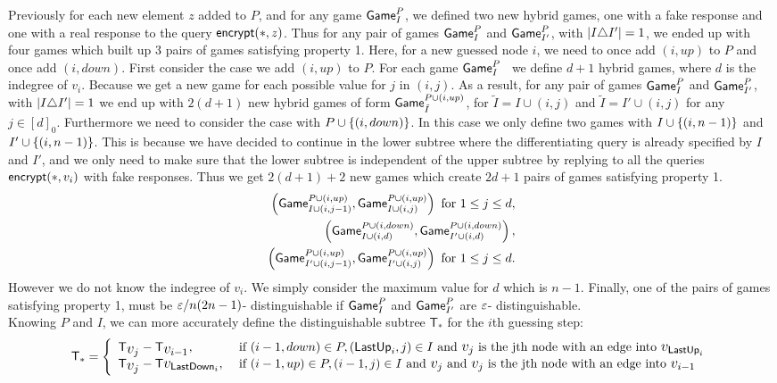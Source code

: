 \documentclass{article}
\newcommand{\encrypt}{{\sf encrypt}}
\newcommand{\game}{{\sf Game}}
\newcommand{\T}{{\mathsf T}}
\newcommand{\dgg}[2]{\game_{#1}^{#2}}
\newcommand{\lastup}{{\mathsf {LastUp}}}
\newcommand{\lastdown}{{\mathsf {LastDown}}}
\newcommand{\gpi}{$\game^P_I$}
\newcommand{\bigv}[1]{\mbox{\large $v_{#1}$}}
\begin{document}
Previously for each new element $z$ added to $P$, and for any game \gpi, we defined two new hybrid games, one with a fake response and one with a real response to the query $\encrypt(*,z)$. Thus for any pair of games $\dgg{I}{P}$ and $\dgg{I'}{P}$, with $\left| I \triangle I' \right|=1$, we ended up with four games which built up 3 pairs of games satisfying property 1. Here, for a new guessed node $i$, we need to once add $(i,up) $ to $P$ and once add $(i,down)$. First consider the case we add $(i,up)$ to $P$. For each game \gpi~ we define $d+1$ hybrid games, where $d$ is the indegree of $v_i$. Because we get a new game for each possible value for $j$ in $(i,j)$. As a result, for any pair of games $\dgg{I}{P}$ and $\dgg{I'}{P}$, with $\left| I \triangle I' \right|=1$ we end up with $2(d+1)$ new hybrid games of form $\dgg{\tilde{I}}{P\cup (i,up)}$, for $\tilde{I}=I\cup (i,j)$ and $\tilde{I}=I'\cup (i,j)$ for any $j\in [d]_0$. Furthermore we need to consider the case with $P\cup \left\{ (i,down) \right\}$. In this case we only define two games with $I\cup \left\{ (i,n-1) \right\}$ and $I'\cup \left\{ (i,n-1) \right\}$. This is because we have decided to continue in the lower subtree where the differentiating query is already specified by $I$ and $I'$, and we only need to make sure that the lower subtree is independent of the upper subtree by replying to all the queries $\encrypt(*,v_i)$ with fake responses. Thus we get $2(d+1)+2$ new games which create $2d+1$ pairs of games satisfying property 1.
\begin{align*}
\rob{\dgg{I\cup (i,j-1)}{P\cup (i,up)},\dgg{I\cup (i,j)}{P\cup (i,up)} }\text{ for } 1\leq j \leq d,  \\ 
\rob{\dgg{I\cup (i,d)}{P\cup (i,down)},\dgg{I'\cup (i,d)}{P\cup (i,down)}}, \\
\rob{\dgg{I'\cup (i,j-1)}{P\cup (i,up)},\dgg{I'\cup (i,j)}{P\cup (i,up)}} \text{ for } 1\leq j \leq d.  \\ 
\end{align*}
However we do not know the indegree of $v_i$. We simply consider the maximum value for $d$ which is $n-1$. Finally, one of the pairs of games satisfying property 1, must be $\varepsilon/n(2n-1)$- distinguishable if $\dgg{I}{P}$ and $\dgg{I'}{P}$ are $\varepsilon$- distinguishable. \\

Knowing $P$ and $I$, we can more accurately define the distinguishable subtree $\T_ *$ for the $i$th guessing step:
\begin{align*}
\T_*=\left\{ \begin{array}{l l}
\T_{\bigv{j}}-\T_{\bigv{i-1}}, &\text{ if } (i-1,down) \in P,(\lastup_i,j)\in I \text{ and }\bigv{j} \text{ is the jth node with an edge into } \bigv{\lastup_i}\\
\T_{\bigv{j}}-\T{\bigv{\lastdown_i}},  &\text{ if }(i-1,up)\in P,(i-1,j)\in I \text{ and }\bigv{j} \text{ and }\bigv{j} \text{ is the jth node with an edge into }  \bigv{i-1} \end{array}\right.
\end{align*} 
\end{document}

